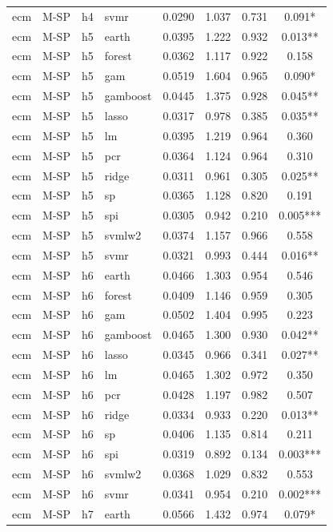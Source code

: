 \begin{ThreePartTable}
\begin{longtable}[t]{llclcccc}
ecm & M-SP & h4 & svmr & 0.0290 & 1.037 & 0.731 & 0.091*\\
\addlinespace
ecm & M-SP & h5 & earth & 0.0395 & 1.222 & 0.932 & 0.013**\\
ecm & M-SP & h5 & forest & 0.0362 & 1.117 & 0.922 & 0.158\\
ecm & M-SP & h5 & gam & 0.0519 & 1.604 & 0.965 & 0.090*\\
ecm & M-SP & h5 & gamboost & 0.0445 & 1.375 & 0.928 & 0.045**\\
ecm & M-SP & h5 & lasso & 0.0317 & 0.978 & 0.385 & 0.035**\\
ecm & M-SP & h5 & lm & 0.0395 & 1.219 & 0.964 & 0.360\\
ecm & M-SP & h5 & pcr & 0.0364 & 1.124 & 0.964 & 0.310\\
ecm & M-SP & h5 & ridge & 0.0311 & 0.961 & 0.305 & 0.025**\\
ecm & M-SP & h5 & sp & 0.0365 & 1.128 & 0.820 & 0.191\\
ecm & M-SP & h5 & spi & 0.0305 & 0.942 & 0.210 & 0.005***\\
ecm & M-SP & h5 & svmlw2 & 0.0374 & 1.157 & 0.966 & 0.558\\
ecm & M-SP & h5 & svmr & 0.0321 & 0.993 & 0.444 & 0.016**\\
\addlinespace
ecm & M-SP & h6 & earth & 0.0466 & 1.303 & 0.954 & 0.546\\
ecm & M-SP & h6 & forest & 0.0409 & 1.146 & 0.959 & 0.305\\
ecm & M-SP & h6 & gam & 0.0502 & 1.404 & 0.995 & 0.223\\
ecm & M-SP & h6 & gamboost & 0.0465 & 1.300 & 0.930 & 0.042**\\
ecm & M-SP & h6 & lasso & 0.0345 & 0.966 & 0.341 & 0.027**\\
ecm & M-SP & h6 & lm & 0.0465 & 1.302 & 0.972 & 0.350\\
ecm & M-SP & h6 & pcr & 0.0428 & 1.197 & 0.982 & 0.507\\
ecm & M-SP & h6 & ridge & 0.0334 & 0.933 & 0.220 & 0.013**\\
ecm & M-SP & h6 & sp & 0.0406 & 1.135 & 0.814 & 0.211\\
ecm & M-SP & h6 & spi & 0.0319 & 0.892 & 0.134 & 0.003***\\
ecm & M-SP & h6 & svmlw2 & 0.0368 & 1.029 & 0.832 & 0.553\\
ecm & M-SP & h6 & svmr & 0.0341 & 0.954 & 0.210 & 0.002***\\
\addlinespace
ecm & M-SP & h7 & earth & 0.0566 & 1.432 & 0.974 & 0.079*\\

\end{longtable}
\end{ThreePartTable}
